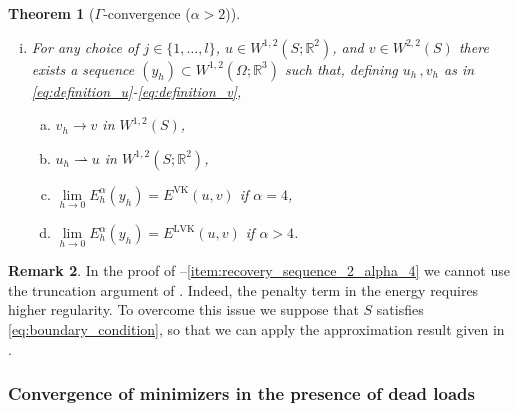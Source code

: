 \documentclass{article}
\theoremstyle{plain}
\newtheorem{teo}{Theorem}[section]
\theoremstyle{plain}
\theoremstyle{plain}
\theoremstyle{plain}
\theoremstyle{plain}
\theoremstyle{definition}
\newtheorem{remark}[teo]{Remark}
\theoremstyle{definition}
\renewcommand{\r}{\mathbb{R}}
\newcommand{\todeb}{\rightharpoonup}
\DeclareMathOperator{\VK}{VK}
\DeclareMathOperator{\LVK}{LVK}
\DeclareMathOperator{\CVK}{CVK}
\begin{document}
\begin{teo}[$\Gamma$-convergence ($\alpha > 2$)]
\begin{enumerate}[(i)]
\begin{enumerate}[(a)]
		\item $v_h \to v$ in $W^{1, 2}(S)$, where $v_h$ is defined as in \eqref{eq:definition_v},
		\item $\lim\limits_{h \to 0} E_h^\alpha(y_h) = E^{\CVK}(v)$.
	\end{enumerate}\label{item:recovery_sequence_2_alpha_4}
	\item For any choice of $j \in \{1, \dots, l\}$, $u \in W^{1,2}(S; \r^2)$, and $v \in W^{2,2}(S)$ there exists a sequence $(y_h) \subset W^{1,2}(\Omega; \r^3)$ such that, defining $u_h \,, v_h$ as in \eqref{eq:definition_u}-\eqref{eq:definition_v},
	\begin{enumerate}[(a)]
		\item $v_h \to v$ in $W^{1,2}(S)$,
		\item $u_h \todeb u$ in $W^{1, 2}(S; \r^2)$,
		\item $\lim\limits_{h \to 0} E_h^\alpha(y_h) = E^{\VK}(u, v)$ if $\alpha = 4$, \label{item:recovery_sequence_alpha_4}
		\item $\lim\limits_{h \to 0} E_h^\alpha(y_h) = E^{\LVK}(u, v)$ if $\alpha > 4$. \label{item:recovery_sequence_alpha_greater_4}
	\end{enumerate}\label{item:recovery_sequence_alpha_greater_equal_4}
	\end{enumerate}
\end{teo}

\begin{remark}
    In the proof of --\ref{item:recovery_sequence_2_alpha_4} we cannot use the truncation argument of \cite{FRIESECKE2002,FRIESECKE2006}.
    Indeed, the penalty term in the energy requires higher regularity.
    To overcome this issue we suppose that $ S $ satisfies \eqref{eq:boundary_condition}, so that we can apply the approximation result given in \cite{HORNUNG2011}. 
\end{remark}

\subsubsection{Convergence of minimizers in the presence of dead loads}
\end{document}
